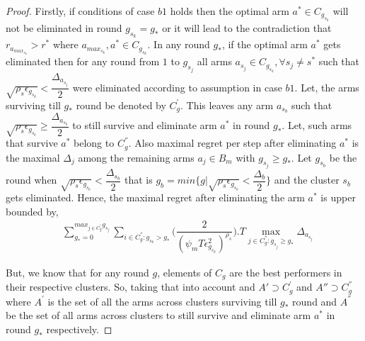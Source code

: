 \begin{proof}
	Firstly, if conditions of case $b1$ holds then the optimal arm $a^{*}\in C_{g_{s_{k}}}$ will not be eliminated in round $g_{s_{k}}=g_{*}$ or it will lead to the contradiction that $r_{a_{max_{s_{k}}}}>r^{*}$ where $a_{max_{s_{k}}},a^{*}\in C_{g_{s_{k}}}$. In any round $g_{*}$, if the optimal arm $a^{*}$ gets eliminated then for any round from $1$ to $g_{s_{j}}$ all arms $a_{s_{j}}\in C_{g_{s_{k}}},\forall s_{j}\neq s^{*}$ such that $\sqrt{\rho_{s}\epsilon_{g_{s_{k}}}}<\dfrac{\Delta_{a_{s_{j}}}}{2}$ were eliminated according to assumption in case $b1$. Let, the arms surviving till $g_{*}$ round be denoted by $C_{g}^{'}$. This leaves any arm $a_{s_{b}}$ such that $\sqrt{\rho_{s}\epsilon_{g_{s_{b}}}}\geq\dfrac{\Delta_{a_{s_{b}}}}{2}$ to still survive and eliminate arm $a^{*}$ in round $g_{*}$. Let, such arms that survive $a^{*}$ belong to $C_{g}^{''}$. Also maximal regret per step after eliminating $a^{*}$ is the maximal $\Delta_{j}$ among the remaining arms $a_{j}\in B_{m}$ with $g_{s_{j}}\geq g_{
*}$.  Let $g_{s_{b}}$ be the round when $\sqrt{\rho_{s}\epsilon_{g_{s_{b}}}}<\dfrac{\Delta_{s_{b}}}{2}$ that is $g_{b}=min\lbrace g|\sqrt{\rho_{s}\epsilon_{g_{s_{b}}}}<\dfrac{\Delta_{b}}{2}\rbrace$ and the cluster $s_{b}$ gets eliminated. Hence, the maximal regret after eliminating the arm $a^{*}$ is upper bounded by, 
 \begin{align*}
 &\sum_{g_{*}=0}^{max_{j\in C_{g}^{'}}g_{s_{j}}}\sum_{i\in C_{g}^{''}:g_{s_{k}}>g_{*}}\bigg(\dfrac{2}{(\psi_{m}T\epsilon_{g_{s_{k}}}^{2})^{\rho_{s}}} \bigg).T\max_{j\in C_{g}^{''}:g_{s_{j}}\geq g_{*}}{\Delta}_{a_{s_{j}}}
 \end{align*}
 
But, we know that for any round $g$, elements of $C_{g}$ are the best performers in their respective clusters. So, taking that into account and $A'\supset C_{g}^{'}$ and $A''\supset C_{g}^{''}$ where $A^{'}$ is the set of all the arms across clusters surviving till $g_{*}$ round and $A^{''}$ be the set of all arms across clusters to still survive and eliminate arm $a^{*}$ in round $g_{*}$ respectively. 


\end{proof}
